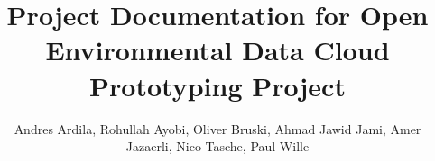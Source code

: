 \documentclass{llncs}
\begin{document}
\title{Project Documentation for Open Environmental Data Cloud Prototyping Project}
%
%
\author{Andres Ardila, Rohullah Ayobi, Oliver Bruski, Ahmad Jawid Jami, Amer Jazaerli, Nico Tasche, Paul Wille}


\maketitle              %

\begin{abstract}
\end{abstract}

\pagebreak

\tableofcontents

\clearpage











%
%
%

\end{document}
